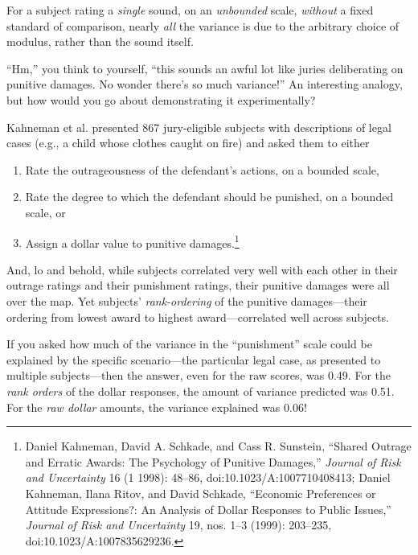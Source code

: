 {
 For a subject rating a \textit{single} sound, on an
\textit{unbounded} scale, \textit{without} a fixed standard of
comparison, nearly \textit{all} the variance is due to the arbitrary
choice of modulus, rather than the sound itself.}

{
 ``Hm,'' you think to yourself,
``this sounds an awful lot like juries deliberating on
punitive damages. No wonder there's so much
variance!'' An interesting analogy, but how would you
go about demonstrating it experimentally?}

{
 Kahneman et al. presented 867 jury-eligible subjects with
descriptions of legal cases (e.g., a child whose clothes caught on
fire) and asked them to either}

\begin{enumerate}
\item {
 Rate the outrageousness of the defendant's
actions, on a bounded scale,}

\item {
 Rate the degree to which the defendant should be punished, on a
bounded scale, or}

\item {
 Assign a dollar value to punitive damages.\footnote{Daniel Kahneman, David A. Schkade, and Cass R. Sunstein,
``Shared Outrage and Erratic Awards: The Psychology of
Punitive Damages,'' \textit{Journal of Risk and
Uncertainty} 16 (1 1998): 48--86, doi:10.1023/A:1007710408413; Daniel
Kahneman, Ilana Ritov, and David Schkade, ``Economic
Preferences or Attitude Expressions?: An Analysis of Dollar Responses
to Public Issues,'' \textit{Journal of Risk and
Uncertainty} 19, nos. 1--3 (1999): 203--235,
doi:10.1023/A:1007835629236.}}
\end{enumerate}

{
 And, lo and behold, while subjects correlated very well with each
other in their outrage ratings and their punishment ratings, their
punitive damages were all over the map. Yet subjects'
\textit{rank-ordering} of the punitive damages---their ordering from
lowest award to highest award---correlated well across subjects.}

{
 If you asked how much of the variance in the
``punishment'' scale could be
explained by the specific scenario---the particular legal case, as
presented to multiple subjects---then the answer, even for the raw
scores, was 0.49. For the \textit{rank orders} of the dollar responses,
the amount of variance predicted was 0.51. For the \textit{raw dollar}
amounts, the variance explained was 0.06!}


